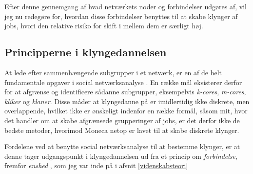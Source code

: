Efter denne gennemgang af hvad netværkets noder og forbindelser udgøres af, vil jeg nu redegøre for, hvordan disse forbindelser benyttes til at skabe klynger af jobs, hvori den relative risiko for skift i mellem dem er særligt høj.

\subsection{Principperne i klyngedannelsen \label{segogklynge}}

At lede efter sammenhængende subgrupper i et netværk, er en af de helt fundamentale opgaver i social netværksanalyse \parencite[6]{Touboel2015}. En række mål eksisterer derfor for at afgrænse og identificere sådanne subgrupper, eksempelvis \emph{k-cores}, \emph{m-cores}, \emph{kliker} og \emph{klaner}.  Disse måder at klyngedanne på er imidlertidig ikke diskrete, men overlappende, hvilket ikke er ønskeligt indenfor en række formål, såsom mit, hvor det handler om at skabe afgrænsede grupperinger af jobs, er det derfor ikke de bedste metoder, hvorimod Moneca netop er lavet til at skabe diskrete klynger. 

Fordelene ved at benytte social netværksanalyse til at bestemme klynger, er at denne tager udgangspunkt i klyngedannelsen ud fra et princip om \emph{forbindelse}, fremfor \emph{enshed} \parencite[6]{Touboel2015}, som jeg var inde på i afsnit \ref{videnskabsteori} 


